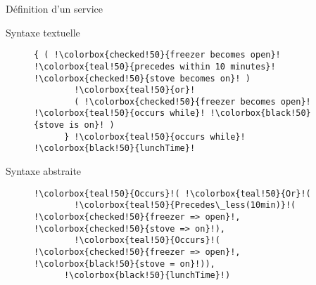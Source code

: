 \begin{frame}[fragile]{Définition d'un service}
\addtocounter{framenumber}{-1}

  \begin{coloredbox}[black]{Syntaxe textuelle}
  \begin{figure}[h]
    \begin{lstlisting}[language=MaloyaText,basicstyle=\ttfamily\footnotesize,escapechar=!]
      { ( !\colorbox{checked!50}{freezer becomes open}! !\colorbox{teal!50}{precedes within 10 minutes}! !\colorbox{checked!50}{stove becomes on}! )
        !\colorbox{teal!50}{or}!
        ( !\colorbox{checked!50}{freezer becomes open}! !\colorbox{teal!50}{occurs while}! !\colorbox{black!50}{stove is on}! ) 
      } !\colorbox{teal!50}{occurs while}! !\colorbox{black!50}{lunchTime}!
    \end{lstlisting}
  \end{figure}
\end{coloredbox}
 \begin{coloredbox}[black]{Syntaxe abstraite}
  \begin{figure}[!h]
    \begin{lstlisting}[language=Maloya,basicstyle=\ttfamily\footnotesize,escapechar=!]
      !\colorbox{teal!50}{Occurs}!( !\colorbox{teal!50}{Or}!(
        !\colorbox{teal!50}{Precedes\_less(10min)}!( !\colorbox{checked!50}{freezer => open}!, !\colorbox{checked!50}{stove => on}!),
        !\colorbox{teal!50}{Occurs}!( !\colorbox{checked!50}{freezer => open}!, !\colorbox{black!50}{stove = on}!)),
      !\colorbox{black!50}{lunchTime}!)
    \end{lstlisting}
  \end{figure}
\end{coloredbox}
\end{frame}